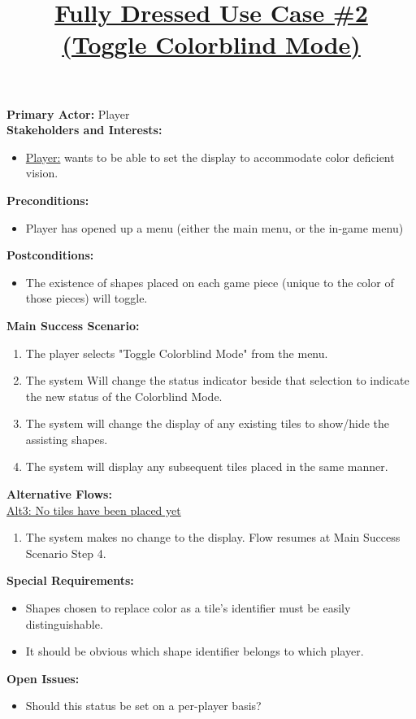 \documentclass[16pt]{article}
\begin{document}
	\date{}
	\author{}
	\title{ \bf
		\underline{Fully Dressed Use Case \#2} \\ 
		\underline{(Toggle Colorblind Mode)}
	}
	\maketitle

	\textbf{Primary Actor:} Player \\

	\textbf{Stakeholders and Interests:}
	\begin{itemize}
		\item \underline{Player:}
		wants to be able to set the display to accommodate color deficient vision.
	\end{itemize}

	\textbf{Preconditions:}
	\begin{itemize}
		\item Player has opened up a menu (either the main menu, or the in-game menu)
	\end{itemize}

	\textbf{Postconditions:}
	\begin{itemize}
		\item The existence of shapes placed on each game piece (unique to the color of those pieces) will toggle.
	\end{itemize}

	\textbf{Main Success Scenario:}
	\begin{enumerate}
		\item The player selects "Toggle Colorblind Mode" from the menu.
		\item The system Will change the status indicator beside that selection to indicate the new status of the Colorblind Mode. 
		\item The system will change the display of any existing tiles to show/hide the assisting shapes.
		\item The system will display any subsequent tiles placed in the same manner.
	\end{enumerate}

	\textbf{Alternative Flows:} \\
	\underline{Alt3: No tiles have been placed yet}
	\begin{enumerate}
		\item The system makes no change to the display. Flow resumes at Main Success Scenario Step 4.
	\end{enumerate}

	\textbf{Special Requirements:}
	\begin{itemize}
		\item Shapes chosen to replace color as a tile's identifier must be easily distinguishable.
		\item It should be obvious which shape identifier belongs to which player. 
	\end{itemize}

	\textbf{Open Issues:}
	\begin{itemize}
		\item Should this status be set on a per-player basis?
	\end{itemize}
\end{document}
